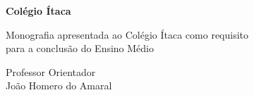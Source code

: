 \newpage
\thispagestyle{empty}
\begin{center}
\vspace*{1\baselineskip}
\textbf{Colégio Ítaca}

\vspace{4\baselineskip}

\textbf{\theauthor}

\vspace{10\baselineskip}

\thetitle

\vspace{5\baselineskip}
\end{center}

\begin{flushright}

{\small
Monografia apresentada ao Colégio Ítaca como requisito\\
para a conclusão do Ensino Médio

\vspace{2\baselineskip}
Professor Orientador\\João Homero do Amaral}
\normalsize

\vspace{4\baselineskip}

\end{flushright}

\begin{centering}

\onehalfspacing
\normalsize
\thedate

\end{centering}

